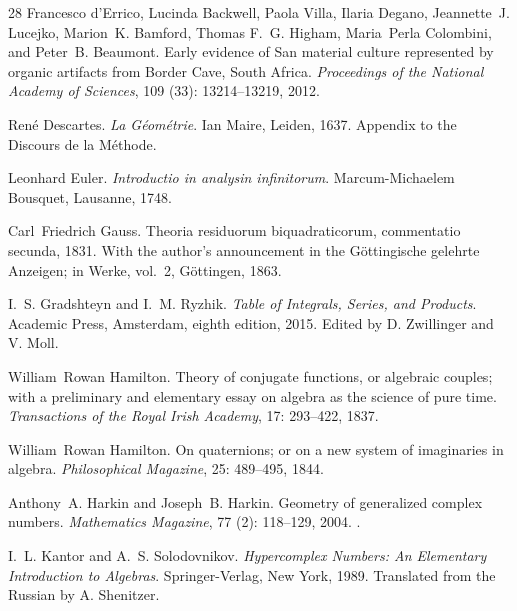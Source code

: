 \documentclass[11pt,a4paper]{amsart}
\theoremstyle{plain}
\theoremstyle{definition}
\theoremstyle{remark}
\begin{document}
\begin{thebibliography}{28}
Francesco d'Errico, Lucinda Backwell, Paola Villa, Ilaria Degano, Jeannette~J.
  Lucejko, Marion~K. Bamford, Thomas F.~G. Higham, Maria~Perla Colombini, and
  Peter~B. Beaumont.
\newblock Early evidence of {San} material culture represented by organic
  artifacts from {Border Cave}, {South Africa}.
\newblock \emph{Proceedings of the National Academy of Sciences}, 109
  (33): 13214--13219, 2012.

Ren{\'e} Descartes.
\newblock \emph{La G{\'e}om{\'e}trie}.
\newblock Ian Maire, Leiden, 1637.
\newblock Appendix to the Discours de la M{\'e}thode.

Leonhard Euler.
\newblock \emph{Introductio in analysin infinitorum}.
\newblock Marcum-Michaelem Bousquet, Lausanne, 1748.

Carl~Friedrich Gauss.
\newblock Theoria residuorum biquadraticorum, commentatio secunda, 1831.
\newblock With the author's announcement in the G{\"o}ttingische gelehrte
  Anzeigen; in Werke, vol.~2, G{\"o}ttingen, 1863.

I.~S. Gradshteyn and I.~M. Ryzhik.
\newblock \emph{Table of Integrals, Series, and Products}.
\newblock Academic Press, Amsterdam, eighth edition, 2015.
\newblock Edited by D. Zwillinger and V. Moll.

William~Rowan Hamilton.
\newblock Theory of conjugate functions, or algebraic couples; with a
  preliminary and elementary essay on algebra as the science of pure time.
\newblock \emph{Transactions of the Royal Irish Academy}, 17:
  293--422, 1837.

William~Rowan Hamilton.
\newblock On quaternions; or on a new system of imaginaries in algebra.
\newblock \emph{Philosophical Magazine}, 25: 489--495, 1844.

Anthony~A. Harkin and Joseph~B. Harkin.
\newblock Geometry of generalized complex numbers.
\newblock \emph{Mathematics Magazine}, 77 (2): 118--129,
  2004.
\newblock {}.

I.~L. Kantor and A.~S. Solodovnikov.
\newblock \emph{Hypercomplex Numbers: An Elementary Introduction to Algebras}.
\newblock Springer-Verlag, New York, 1989.
\newblock Translated from the Russian by A. Shenitzer.


\end{thebibliography}
\end{document}
